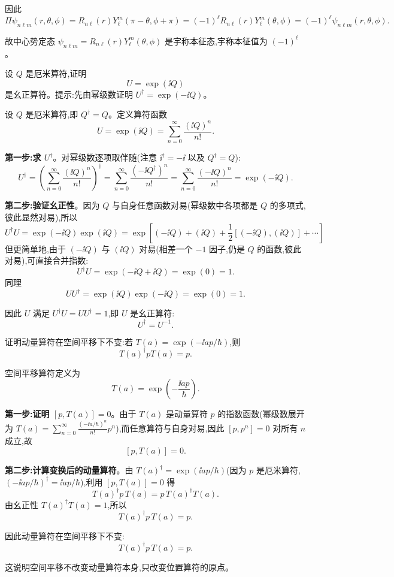 \begin{solution}
	因此
	\[
	\Pi\psi_{n\ell m}(r,\theta,\phi)=R_{n\ell}(r)Y_\ell^m(\pi-\theta,\phi+\pi)
	=(-1)^\ell R_{n\ell}(r)Y_\ell^m(\theta,\phi)=(-1)^\ell\psi_{n\ell m}(r,\theta,\phi).
	\]

	故中心势定态 $\psi_{n\ell m}=R_{n\ell}(r)Y_\ell^m(\theta,\phi)$ 是宇称本征态,宇称本征值为 $\boxed{(-1)^\ell}$。
	\end{solution}

\begin{question}
设 $Q$ 是厄米算符,证明
\[
U=\exp(\ii Q)
\]
是幺正算符。提示:先由幂级数证明 $U^\dagger=\exp(-\ii Q)$。
\end{question}
\begin{solution}
	设 $Q$ 是厄米算符,即 $Q^\dagger=Q$。定义算符函数
	\[
	U=\exp(\ii Q)=\sum_{n=0}^\infty\frac{(\ii Q)^n}{n!}.
	\]

	\textbf{第一步:求 $U^\dagger$}。对幂级数逐项取伴随(注意 $\ii^\dagger=-\ii$ 以及 $Q^\dagger=Q$):
	\[
	U^\dagger=\left(\sum_{n=0}^\infty\frac{(\ii Q)^n}{n!}\right)^\dagger
	=\sum_{n=0}^\infty\frac{(-\ii Q^\dagger)^n}{n!}
	=\sum_{n=0}^\infty\frac{(-\ii Q)^n}{n!}
	=\exp(-\ii Q).
	\]

	\textbf{第二步:验证幺正性}。因为 $Q$ 与自身任意函数对易(幂级数中各项都是 $Q$ 的多项式,彼此显然对易),所以
	\[
	U^\dagger U=\exp(-\ii Q)\exp(\ii Q)
	=\exp[(-\ii Q)+(\ii Q)+\frac12[(-\ii Q),(\ii Q)]+\cdots]
	\]
	但更简单地,由于 $(-\ii Q)$ 与 $(\ii Q)$ 对易(相差一个 $-1$ 因子,仍是 $Q$ 的函数,彼此对易),可直接合并指数:
	\[
	U^\dagger U = \exp(-\ii Q + \ii Q) = \exp(0) = 1.
	\]
	同理
	\[
	UU^\dagger = \exp(\ii Q)\exp(-\ii Q) = \exp(0) = 1.
	\]

	因此 $U$ 满足 $U^\dagger U = UU^\dagger = 1$,即 $U$ 是幺正算符:
	\[
	\boxed{U^\dagger = U^{-1}}.
	\]
	\end{solution}

\begin{question}
证明动量算符在空间平移下不变:若 $T(a)=\exp(-\ii ap/\hbar)$,则
\[
T(a)^\dagger pT(a)=p.
\]
\end{question}
\begin{solution}
	空间平移算符定义为
	\[
	T(a)=\exp\!\left(-\frac{\ii a p}{\hbar}\right).
	\]

	\textbf{第一步:证明 $[p,T(a)]=0$}。由于 $T(a)$ 是动量算符 $p$ 的指数函数(幂级数展开为 $T(a)=\sum_{n=0}^\infty\frac{(-\ii a/\hbar)^n}{n!}p^n$),而任意算符与自身对易,因此 $[p,p^n]=0$ 对所有 $n$ 成立,故
	\[
	[p,T(a)]=0.
	\]

	\textbf{第二步:计算变换后的动量算符}。由 $T(a)^\dagger=\exp(\ii a p/\hbar)$(因为 $p$ 是厄米算符,$(-\ii a p/\hbar)^\dagger=\ii a p/\hbar$),利用 $[p,T(a)]=0$ 得
	\[
	T(a)^\dagger p\,T(a) = p\,T(a)^\dagger T(a).
	\]
	由幺正性 $T(a)^\dagger T(a)=1$,所以
	\[
	T(a)^\dagger p\,T(a) = p.
	\]

	因此动量算符在空间平移下不变:
	\[
	\boxed{T(a)^\dagger p\,T(a)=p}.
	\]

	这说明空间平移不改变动量算符本身,只改变位置算符的原点。
	\end{solution}


